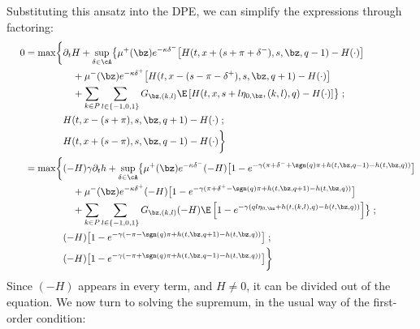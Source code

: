 \documentclass[12pt]{article}
\begin{document}
Substituting this ansatz into the DPE, we can simplify the expressions through factoring:
\begin{align*}
0 = \max \biggl\lbrace & \partial_t H + \sup \limits_{\delta \in \cA} \bigl\lbrace \mu^+(\bz) e^{ -\kappa \delta^{-}} \bigl[ H(t,x+(s+\pi+\delta^-),s,\bz,q-1) - H(\cdot) \bigr] \\
& \quad + \mu^-(\bz) e^{ -\kappa \delta^{+}} \bigl[ H(t,x-(s-\pi-\delta^+),s,\bz,q+1) - H(\cdot) \bigr] \\
& \quad + \sum_{k\in P} \sum_{l \in \{-1,0,1\}} G_{\bz,(k,l)} \E \left[ H(t,x,s+l\eta_{0,\bz},(k,l),q) - H(\cdot) \right] \bigr\rbrace \; ; \\
& H(t,x-(s+\pi), s, \bz, q+1) - H(\cdot) \; ; \\
&  H(t,x+(s-\pi), s, \bz, q-1) - H(\cdot) \biggr\rbrace \\
\phantom{0 {}={}} = \max \biggl\lbrace & (-H)\gamma \partial_t h + \sup \limits_{\delta \in \cA} \bigl\lbrace \mu^+(\bz) e^{ -\kappa \delta^{-}} (-H) \bigl[ 1 - e^{-\gamma(\pi + \delta^- + \sgn(q)\pi + h(t,\bz,q-1) - h(t,\bz,q))} \bigr] \\
& \quad + \mu^-(\bz) e^{ -\kappa \delta^{+}} (-H) \bigl[ 1 - e^{-\gamma(\pi + \delta^+ - \sgn(q)\pi + h(t,\bz,q+1) - h(t,\bz,q))} \bigr] \\
& \quad + \sum_{k\in P} \sum_{l \in \{-1,0,1\}} G_{\bz,(k,l)} (-H) \E \left[ 1 - e^{-\gamma(ql\eta_{0,\bz} + h(t,(k,l),q) - h(t,\bz,q))} \right] \bigr\rbrace \; ; \\
& (-H) \bigl[ 1- e^{-\gamma(-\pi - \sgn(q)\pi + h(t,\bz,q+1) - h(t,\bz,q)) } \bigr] \; ; \\
&  (-H) \bigl[ 1- e^{-\gamma(-\pi + \sgn(q)\pi + h(t,\bz,q-1) - h(t,\bz,q)) } \bigr] \biggr\rbrace
\end{align*}
Since $(-H)$ appears in every term, and $H \neq 0$, it can be divided out of the equation. We now turn to solving the supremum, in the usual way of the first-order condition:
\end{document}
